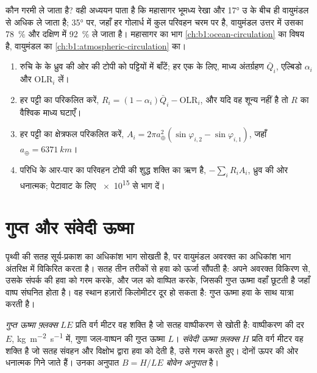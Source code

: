 कौन गरमी ले जाता है? वही अध्ययन पाता है कि महासागर भूमध्य रेखा और \ang{17} उ के बीच ही वायुमंडल से अधिक ले जाता है; \ang{35} पर, जहाँ हर गोलार्ध में कुल परिवहन चरम पर है, वायुमंडल उत्तर में उसका \qty{78}{\percent} और दक्षिण में \qty{92}{\percent} ले जाता है। महासागर का भाग \cref{ch:b1:ocean-circulation} का विषय है, वायुमंडल का \cref{ch:b1:atmospheric-circulation} का।

\begin{method}[ज़ोनल पट्टियों से परिवहन]\label{met:b1:radiation-heat-transport:bands}
\begin{enumerate}
  \item रुचि के  के ध्रुव की ओर की टोपी को पट्टियों में बाँटें; हर एक के लिए,
        माध्य अंतर्ग्रहण $\bar Q_i$, एल्बिडो $\alpha_i$ और OLR$_i$ लें।
  \item हर पट्टी का  परिकलित करें, $R_i = (1 - \alpha_i)\bar Q_i -
        \text{OLR}_i$, और यदि वह शून्य नहीं है तो $R$ का वैश्विक माध्य घटाएँ।
  \item हर पट्टी का क्षेत्रफल परिकलित करें, $A_i = 2\pi a_\oplus^2(\sin\varphi_{i,2} -
        \sin\varphi_{i,1})$, जहाँ $a_\oplus = \qty{6371}{km}$।
  \item परिधि के आर-पार का परिवहन टोपी की शुद्ध शक्ति का ऋण है,
        $-\sum_i R_i A_i$, ध्रुव की ओर धनात्मक; पेटावाट के लिए \num{e15} से भाग दें।
\end{enumerate}
\end{method}

\section{गुप्त और संवेदी ऊष्मा}\label{sec:b1:radiation-heat-transport:latent}

पृथ्वी की सतह सूर्य-प्रकाश का अधिकांश भाग सोखती है, पर वायुमंडल अवरक्त का अधिकांश भाग अंतरिक्ष में विकिरित करता है। सतह तीन तरीकों से हवा को ऊर्जा सौंपती है: अपने अवरक्त विकिरण से, उसके संपर्क की हवा को गरम करके, और जल को वाष्पित करके, जिसकी गुप्त ऊष्मा वहाँ छूटती है जहाँ वाष्प संघनित होता है। वह स्थान हज़ारों किलोमीटर दूर हो सकता है: गुप्त ऊष्मा हवा के साथ यात्रा करती है।

\begin{definition}[गुप्त और संवेदी ऊष्मा फ़्लक्स; बोवेन अनुपात]\label{def:b1:radiation-heat-transport:surface-fluxes}
\emph{गुप्त ऊष्मा फ़्लक्स} $LE$ प्रति वर्ग मीटर वह शक्ति है जो सतह वाष्पीकरण से खोती है: वाष्पीकरण की दर $E$,
\unit{kg.m^{-2}.s^{-1}} में, गुणा जल-वाष्पन की गुप्त ऊष्मा $L$। \emph{संवेदी ऊष्मा फ़्लक्स} $H$ प्रति वर्ग मीटर वह
शक्ति है जो सतह संवहन और विक्षोभ द्वारा हवा को देती है, उसे गरम करते हुए। दोनों ऊपर की ओर धनात्मक गिने जाते हैं। उनका अनुपात $B = H/LE$ \emph{बोवेन अनुपात} है।
\end{definition}


